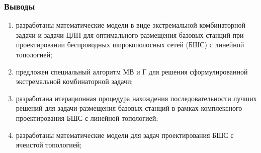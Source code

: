 
\begin{frame}
    \frametitle{Выводы}
    
    \begin{enumerate}
        \item разработаны математические модели в виде экстремальной комбинаторной задачи и
        задачи ЦЛП для оптимального размещения базовых станций при
        проектировании беспроводных широкополосных сетей (БШС) с линейной топологией;
        \item предложен специальный алгоритм МВ и Г для решения сформулированной
        экстремальной комбинаторной задачи;
        \item разработана итерационная процедура нахождения последовательности лучших
        решений для задачи размещения базовых станций в рамках комплексного
        проектирования БШС с линейной топологией;
        \item разработаны математические модели для задач проектирования БШС с ячеистой
        топологией;
    \end{enumerate}
\end{frame}

